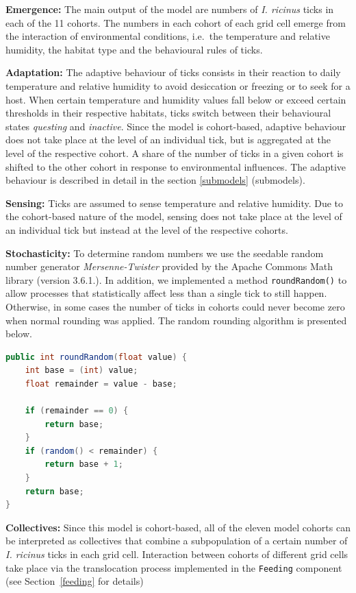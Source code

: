 \documentclass[a4paper, 11pt]{scrartcl}
\newcommand{\inlinecode}[1]{\texttt{\small #1}}
\begin{document}
\textbf{Emergence:} The main output of the model are numbers of \emph{I. ricinus} ticks in each of the 11 cohorts. The numbers in each cohort of each grid cell emerge from the interaction of environmental conditions, i.e.\ the temperature and relative humidity, the habitat type and the behavioural rules of ticks.

\textbf{Adaptation:} The adaptive behaviour of ticks consists in their reaction to daily temperature and relative humidity to avoid desiccation or freezing or to seek for a host. When certain temperature and humidity values fall below or exceed certain thresholds in their respective habitats, ticks switch between their behavioural states \emph{questing} and \emph{inactive}. Since the model is cohort-based, adaptive behaviour does not take place at the level of an individual tick, but is aggregated at the level of the respective cohort. A share of the number of ticks in a given cohort is shifted to the other cohort in response to environmental influences. The adaptive behaviour is described in detail in the section \ref{submodels} (submodels).

\textbf{Sensing:} Ticks are assumed to sense temperature and relative humidity. Due to the cohort-based nature of the model, sensing does not take place at the level of an individual tick but instead at the level of the respective cohorts.

\textbf{Stochasticity:} To determine random numbers we use the seedable random number generator \emph{Mersenne-Twister} provided by the Apache Commons Math library (version 3.6.1.). In addition, we implemented a method \inlinecode{roundRandom()} to allow processes that statistically affect less than a single tick to still happen. Otherwise, in some cases the number of ticks in cohorts could never become zero when normal rounding was applied. The random rounding algorithm is presented below.

\begin{lstlisting}[language = Java, caption = {Overview of roundRandom() method}]
public int roundRandom(float value) {
	int base = (int) value;
	float remainder = value - base;
	
	if (remainder == 0) {
		return base;
	}
	if (random() < remainder) {
		return base + 1;
	}
	return base;
}
\end{lstlisting}


\textbf{Collectives:} Since this model is cohort-based, all of the eleven model cohorts can be interpreted as collectives that combine a subpopulation of a certain number of \emph{I. ricinus} ticks in each grid cell. Interaction between cohorts of different grid cells take place via the translocation process implemented in the \inlinecode{Feeding} component (see Section~\ref{feeding} for details)
\end{document}
